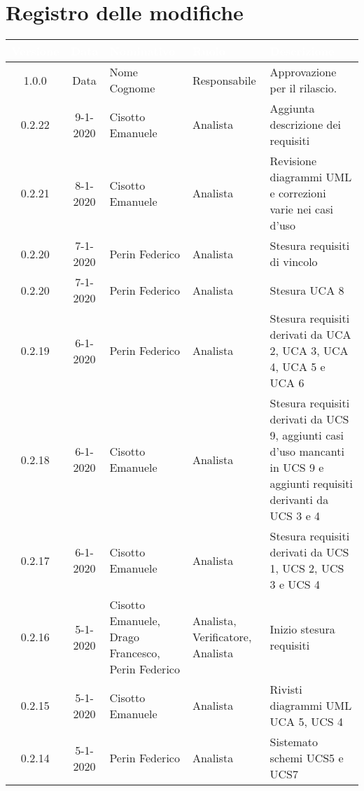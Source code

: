 \section*{Registro delle modifiche}
{
\renewcommand{\arraystretch}{1.5}
\centering
\begin{longtable}{ c c  C{4cm}  C{3cm} C{4cm}}
   \textcolor{white}{\textbf{Versione}} &
   \textcolor{white}{\textbf{Data}}&
   \textcolor{white}{\textbf{Nominativo}}&
   \textcolor{white}{\textbf{Ruolo}}&
   \textcolor{white}{\textbf{Descrizione}}\\
   \endhead


1.0.0 & Data & Nome Cognome & Responsabile & Approvazione per il rilascio.  \\

0.2.22 & 9-1-2020 & Cisotto Emanuele & Analista & Aggiunta descrizione dei requisiti \\

0.2.21 & 8-1-2020 & Cisotto Emanuele & Analista & Revisione diagrammi UML e correzioni varie nei casi d'uso \\

0.2.20 & 7-1-2020 & Perin Federico & Analista & Stesura requisiti di vincolo\\

0.2.20 & 7-1-2020 & Perin Federico & Analista & Stesura UCA 8\\

0.2.19 & 6-1-2020 & Perin Federico & Analista & Stesura requisiti derivati da UCA 2, UCA 3, UCA 4, UCA 5 e UCA 6\\

0.2.18 & 6-1-2020 & Cisotto Emanuele & Analista & Stesura requisiti derivati da UCS 9, aggiunti casi d'uso mancanti in UCS 9 e aggiunti requisiti derivanti da UCS 3 e 4 \\

0.2.17 & 6-1-2020 & Cisotto Emanuele & Analista & Stesura requisiti derivati da UCS 1, UCS 2, UCS 3 e UCS 4 \\

0.2.16 & 5-1-2020 & Cisotto Emanuele, Drago Francesco, Perin Federico & Analista, Verificatore, Analista & Inizio stesura requisiti \\

0.2.15 & 5-1-2020 & Cisotto Emanuele & Analista & Rivisti diagrammi UML UCA 5, UCS 4 \\

0.2.14 & 5-1-2020 & Perin Federico & Analista & Sistemato schemi UCS5 e UCS7 \\


\end{longtable}}
